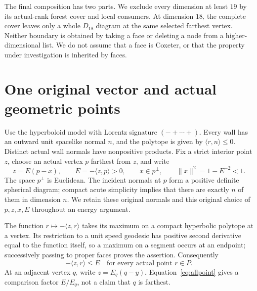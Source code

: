 \documentclass[11pt]{article}
\theoremstyle{definition}
\theoremstyle{remark}
\newcommand{\ip}[2]{\langle #1,#2\rangle}
\newcommand{\norm}[1]{\lVert #1\rVert}
\begin{document}
The final composition has two parts. We exclude every dimension
at least \(19\) by its actual-rank forest cover and local consumers.
At dimension \(18\), the complete cover leaves only a whole
\(D_{18}\) diagram at the same selected farthest vertex. Neither boundary is obtained by taking a face
or deleting a node from a higher-dimensional list. We do not assume
that a face is Coxeter, or that the property under investigation is
inherited by faces.

\section{One original vector and actual geometric points}
\label{sec:geometry}
Use the hyperboloid model with Lorentz signature \((-+\cdots+)\).
Every wall has an outward unit spacelike normal \(n\), and the polytope
is given by \(\ip{r}{n}\leq0\). Distinct actual wall normals have
nonpositive products. Fix a strict interior point \(z\), choose an
actual vertex \(p\) farthest from \(z\), and write
\begin{equation}
\label{eq:original}
 z=E(p-x),\qquad E=-\ip{z}{p}>0,\qquad
 x\in p^\perp,\qquad \norm{x}^{2}=1-E^{-2}<1.
\end{equation}
The space \(p^\perp\) is Euclidean. The incident normals at \(p\) form
a positive definite spherical diagram; compact acute simplicity
implies that there are exactly \(n\) of them in dimension \(n\).
We retain these original normals and this original choice of
\(p,z,x,E\) throughout an energy argument.

The function \(r\mapsto-\ip{z}{r}\) takes its maximum on a compact
hyperbolic polytope at a vertex. Its restriction to a unit speed
geodesic has positive second derivative equal to the function itself,
so a maximum on a segment occurs at an endpoint; successively
passing to proper faces proves the assertion. Consequently
\begin{equation}
\label{eq:allpoint}
 -\ip{z}{r}\leq E\quad\text{for every actual point }r\in P.
\end{equation}
At an adjacent vertex \(q\), write \(z=E_q(q-y)\).
Equation~\eqref{eq:allpoint} gives a comparison factor \(E/E_q\),
not a claim that \(q\) is farthest.
\end{document}
